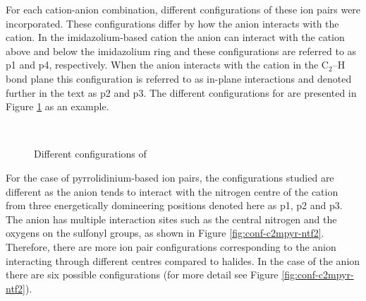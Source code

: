 For each cation-anion combination, different configurations of these ion pairs were incorporated. 
These configurations differ by how the anion interacts with the cation. 
In the imidazolium-based cation  the anion can interact with the cation above and below the imidazolium ring and these configurations are referred to as p1 and p4, respectively.
When the anion interacts with the cation in the $\text{C}_2\text{--H}$ bond plane this configuration is referred to as in-plane interactions and denoted further in the text as p2 and p3.
The different configurations for  are presented in Figure
\protect\ref{fig:conf-c3mim-br}
as an example. 


\begin{figure}
    \centering
    \mbox{
    }
    \mbox{
    }                                 
    \caption{Different configurations of \protect{} \label{fig:conf-c3mim-br}}
\end{figure}

For the case of pyrrolidinium-based ion pairs, the configurations studied are different as the anion tends to interact with the nitrogen centre of the cation from three energetically domineering positions denoted here as p1, p2 and p3.
\cite{Izgorodina2014a}
The \ntf anion has multiple interaction sites such as the central nitrogen and the oxygens on the sulfonyl groups, as shown in Figure \ref{fig:conf-c2mpyr-ntf2}.
Therefore, there are more ion pair configurations corresponding to the anion interacting through different centres compared to halides.
In the case of the \ntf anion there are six possible configurations (for more detail see Figure \ref{fig:conf-c2mpyr-ntf2}). 


